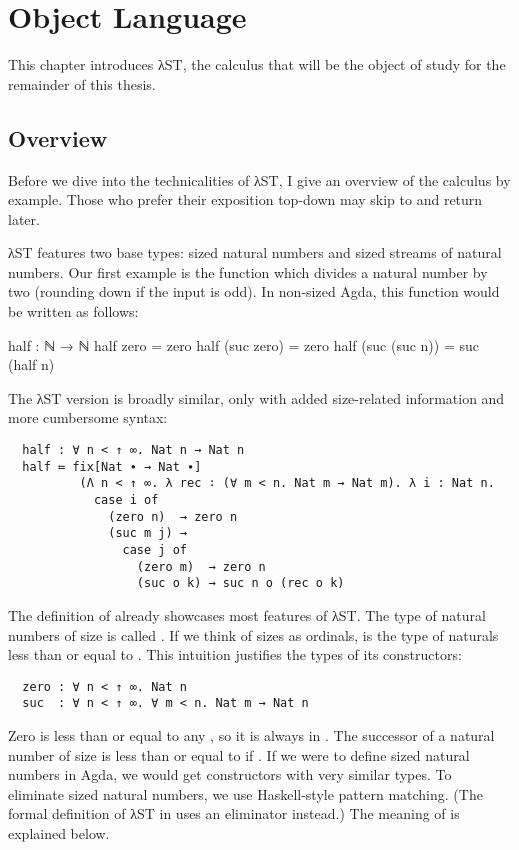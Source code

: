 \chapter{Object Language}
\label{sec:source}

This chapter introduces λST, the calculus that will be the object of study for
the remainder of this thesis.


\section{Overview}
\label{sec:source:overview}

Before we dive into the technicalities of λST, I give an overview of the
calculus by example. Those who prefer their exposition top-down may skip to
 and return later.

λST features two base types: sized natural numbers and sized streams of natural
numbers. Our first example is the function  which divides a natural
number by two (rounding down if the input is odd). In non-sized Agda, this
function would be written as follows:
\begin{code}
  half : ℕ → ℕ
  half zero = zero
  half (suc zero) = zero
  half (suc (suc n)) = suc (half n)
\end{code}
The λST version is broadly similar, only with added size-related information and
more cumbersome syntax:
\begin{verbatim}
  half : ∀ n < ↑ ∞. Nat n → Nat n
  half ≔ fix[Nat ∙ → Nat ∙]
          (Λ n < ↑ ∞. λ rec ∶ (∀ m < n. Nat m → Nat m). λ i : Nat n.
            case i of
              (zero n)  → zero n
              (suc m j) →
                case j of
                  (zero m)  → zero n
                  (suc o k) → suc n o (rec o k)
\end{verbatim}

The definition of  already showcases most features of λST. The type
of natural numbers of size  is called . If we think of
sizes as ordinals,  is the type of naturals less than or equal to
. This intuition justifies the types of its constructors:
\begin{verbatim}
  zero : ∀ n < ↑ ∞. Nat n
  suc  : ∀ n < ↑ ∞. ∀ m < n. Nat m → Nat n
\end{verbatim}
Zero is less than or equal to any , so it is always in .
The successor of a natural number  of size  is less than or
equal to  if . If we were to define sized natural numbers
in Agda, we would get constructors with very similar types. To eliminate sized
natural numbers, we use Haskell-style pattern matching. (The formal definition
of λST in  uses an eliminator instead.) The meaning of
 is explained below.

